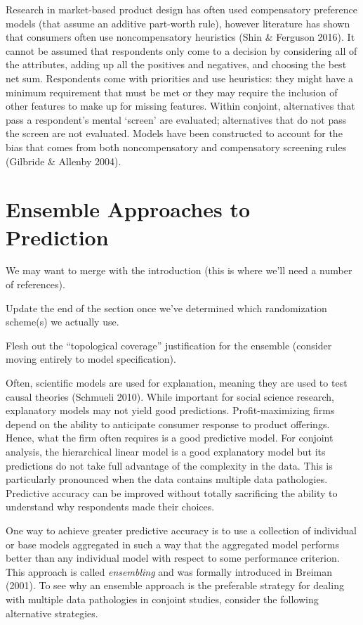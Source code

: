 \documentclass[12pt,titlepage]{mktg-article}
\begin{document}
Research in market-based product design has often used compensatory preference models (that assume an additive part-worth rule), however literature has shown that consumers often use noncompensatory heuristics (Shin \& Ferguson 2016). It cannot be assumed that respondents only come to a decision by considering all of the attributes, adding up all the positives and negatives, and choosing the best net sum. Respondents come with priorities and use heuristics: they might have a minimum requirement that must be met or they may require the inclusion of other features to make up for missing features. Within conjoint, alternatives that pass a respondent's mental `screen' are evaluated; alternatives that do not pass the screen are not evaluated. Models have been constructed to account for the bias that comes from both noncompensatory and compensatory screening rules (Gilbride \& Allenby 2004).

\hypertarget{ensemble-approaches-to-prediction}{%
\section{Ensemble Approaches to Prediction}\label{ensemble-approaches-to-prediction}}

We may want to merge with the introduction (this is where we'll need a number of references).

Update the end of the section once we've determined which randomization scheme(s) we actually use.

Flesh out the ``topological coverage'' justification for the ensemble (consider moving entirely to model specification).

Often, scientific models are used for explanation, meaning they are used to test causal theories (Schmueli 2010). While important for social science research, explanatory models may not yield good predictions. Profit-maximizing firms depend on the ability to anticipate consumer response to product offerings. Hence, what the firm often requires is a good predictive model. For conjoint analysis, the hierarchical linear model is a good explanatory model but its predictions do not take full advantage of the complexity in the data. This is particularly pronounced when the data contains multiple data pathologies. Predictive accuracy can be improved without totally sacrificing the ability to understand why respondents made their choices.

One way to achieve greater predictive accuracy is to use a collection of individual or base models aggregated in such a way that the aggregated model performs better than any individual model with respect to some performance criterion. This approach is called \emph{ensembling} and was formally introduced in Breiman (2001). To see why an ensemble approach is the preferable strategy for dealing with multiple data pathologies in conjoint studies, consider the following alternative strategies.
\end{document}
